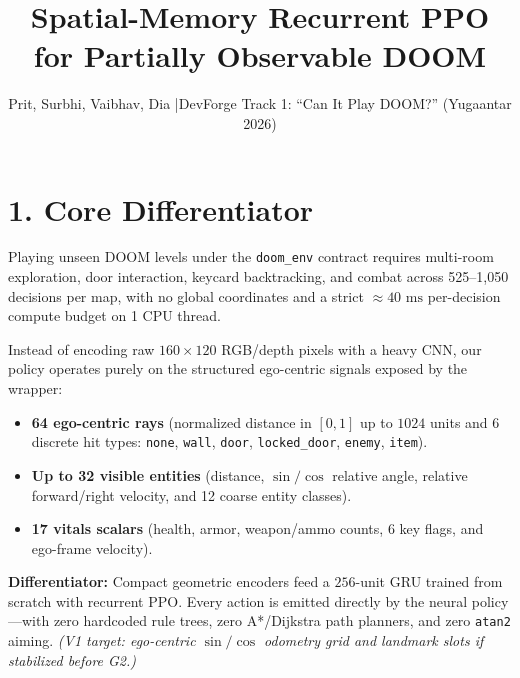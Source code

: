 \documentclass[10pt,twocolumn]{article}
\title{\vspace{-2.2em}\textbf{Spatial-Memory Recurrent PPO for Partially Observable DOOM}\vspace{-0.4em}}
\author{Prit, Surbhi, Vaibhav, Dia \quad|\quad DevForge Track 1: ``Can It Play DOOM?'' (Yugaantar 2026)}
\date{}
\begin{document}
\maketitle
\thispagestyle{empty}

\section*{1. Core Differentiator}
Playing unseen DOOM levels under the \texttt{doom\_env} contract requires multi-room exploration, door interaction, keycard backtracking, and combat across 525--1,050 decisions per map, with no global coordinates and a strict $\approx 40\text{ ms}$ per-decision compute budget on 1 CPU thread.

Instead of encoding raw $160\times 120$ RGB/depth pixels with a heavy CNN, our policy operates purely on the structured ego-centric signals exposed by the wrapper:
\begin{itemize}
  \item \textbf{64 ego-centric rays} (normalized distance in $[0,1]$ up to $1024$ units and 6 discrete hit types: \texttt{none}, \texttt{wall}, \texttt{door}, \texttt{locked\_door}, \texttt{enemy}, \texttt{item}).
  \item \textbf{Up to 32 visible entities} (distance, $\sin/\cos$ relative angle, relative forward/right velocity, and 12 coarse entity classes).
  \item \textbf{17 vitals scalars} (health, armor, weapon/ammo counts, 6 key flags, and ego-frame velocity).
\end{itemize}

\textbf{Differentiator:} Compact geometric encoders feed a $256$-unit GRU trained from scratch with recurrent PPO. Every action is emitted directly by the neural policy---with zero hardcoded rule trees, zero A*/Dijkstra path planners, and zero \texttt{atan2} aiming. \emph{(V1 target: ego-centric $\sin/\cos$ odometry grid and landmark slots if stabilized before G2.)}
\end{document}
